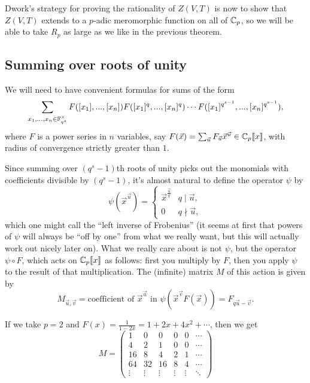 Dwork's strategy for proving the rationality of $Z(V,T)$ is now to show that $Z(V,T)$ extends to a $p$-adic meromorphic function on all of $\mathbb{C}_p$, so we will be able to take $R_p$ as large as we like in the previous theorem.

\subsection{Summing over roots of unity}

We will need to have convenient formulas for sums of the form
\[
\sum_{x_1, ..., x_n \in \mathbb{F}_{q^s}^{\times}} F([x_1], ..., [x_n])F([x_1]^q, ..., [x_n]^q) \cdots F([x_1]^{q^{s-1}}, ..., [x_n]^{q^{s-1}}),
\]
where $F$ is a power series in $n$ variables, say $F(\vec{x}) = \sum_{\vec{u}} F_{\vec{u}} \vec{x}^{\vec{u}} \in \mathbb{C}_p[\![x]\!]$, with radius of convergence strictly greater than $1$.

Since summing over $(q^s-1)$th roots of unity picks out the monomials with coefficients divisible by $(q^s-1)$, it's almost natural to define the operator $\psi$ by
\[
\psi(\vec{x}^{\vec{u}}) = \begin{cases} \vec{x}^{\frac{\vec{u}}{q}} & q \mid \vec{u},\\ 0 & q \nmid \vec{u},\end{cases}
\]
which one might call the ``left inverse of Frobenius'' (it seems at first that powers of $\psi$ will always be ``off by one'' from what we really want, but this will actually work out nicely later on). What we really care about is not $\psi$, but the operator $\psi \circ F$, which acts on $\mathbb{C}_p[\![x]\!]$ as follows: first you multiply by $F$, then you apply $\psi$ to the result of that multiplication. The (infinite) matrix $M$ of this action is given by
\[
M_{\vec{u},\vec{v}} = \text{coefficient of } \vec{x}^{\vec{u}} \text{ in } \psi(\vec{x}^{\vec{v}}F(\vec{x})) = F_{q\vec{u}-\vec{v}}.
\]

\begin{ex} If we take $p=2$ and $F(x) = \frac{1}{1-2x} = 1 + 2x + 4x^2 + \cdots$, then we get
\[
M = \begin{pmatrix}1 & 0 & 0 & 0 & 0 & \cdots\\ 4 & 2 & 1 & 0 & 0 & \cdots\\ 16 & 8 & 4 & 2 & 1 & \cdots \\ 64 & 32 & 16 & 8 & 4 & \cdots\\ \vdots & \vdots & \vdots & \vdots & \vdots & \ddots \end{pmatrix}
\]
\end{ex}

